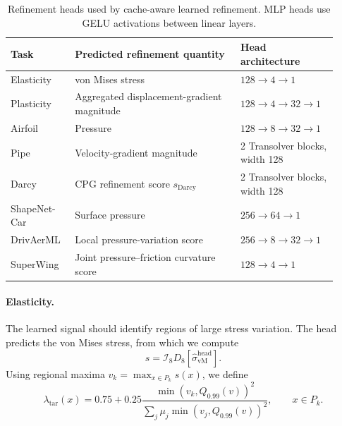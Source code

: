\begin{table}[t]
\centering
\caption{Refinement heads used by cache-aware learned refinement. MLP heads use
GELU activations between linear layers.}
\label{tab:ca_head_architectures}
\small
\begin{tabular}{@{}p{0.18\linewidth}p{0.47\linewidth}p{0.27\linewidth}@{}}
\toprule
Task & Predicted refinement quantity & Head architecture \\
\midrule
Elasticity
& von Mises stress
& $128\!\to\!4\!\to\!1$ \\

Plasticity
& Aggregated displacement-gradient magnitude
& $128\!\to\!4\!\to\!32\!\to\!1$ \\

Airfoil
& Pressure
& $128\!\to\!8\!\to\!32\!\to\!1$ \\

Pipe
& Velocity-gradient magnitude
& 2 Transolver blocks, width 128 \\

Darcy
& CPG refinement score $s_{\mathrm{Darcy}}$
& 2 Transolver blocks, width 128 \\

ShapeNet-Car
& Surface pressure
& $256\!\to\!64\!\to\!1$ \\

DrivAerML
& Local pressure-variation score
& $256\!\to\!8\!\to\!32\!\to\!1$ \\

SuperWing
& Joint pressure--friction curvature score
& $128\!\to\!4\!\to\!1$ \\
\bottomrule
\end{tabular}
\end{table}

\paragraph{Elasticity.}
The learned signal should identify regions of large stress variation. The head
predicts the von Mises stress, from which we compute
\[
    s
    =\mathcal{I}_8D_8[
        \widehat{\sigma}_{\mathrm{vM}}^{\mathrm{head}}
    ].
\]
Using regional maxima
$v_k=\max_{x\in P_k}s(x)$, we define
\begin{equation}
    \lambda_{\mathrm{tar}}(x)
    =0.75+0.25
      \frac{\min(v_k,Q_{0.99}(v))^2}
           {\sum_j\mu_j\min(v_j,Q_{0.99}(v))^2},
    \qquad x\in P_k.
    \label{eq:app_density_elasticity_ca}
\end{equation}

